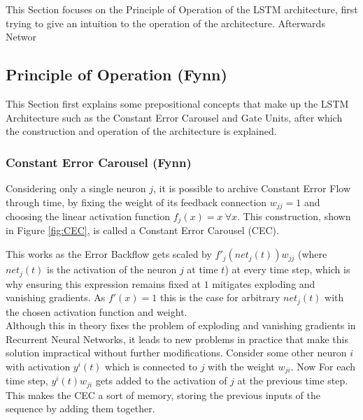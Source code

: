 \documentclass[twoside,a4paper,10pt,DIV=12,BCOR=12mm]{scrartcl}
\begin{document}
This Section focuses on the Principle of Operation of the LSTM architecture, first trying to give an intuition to the operation of the architecture. Afterwards Networ

\subsection{Principle of Operation (Fynn)}
This Section first explains some prepositional concepts that make up the LSTM Architecture such as the Constant Error Carousel and Gate Units, after which the construction and operation of the architecture is explained.

\subsubsection{Constant Error Carousel (Fynn)}
Considering only a single neuron $j$, it is possible to archive Constant Error Flow through time, by fixing the weight of its feedback connection $w_{jj}=1$ and choosing the linear activation function $f_j(x)=x\ \forall x$. This construction, shown in Figure \ref{fig:CEC}, is called a Constant Error Carousel (CEC).\cite{hochreiter1997lstm}
\begin{center}
\label{fig:CEC}
\end{center}
This works as the Error Backflow gets scaled by $f'_j(net_j(t))w_{jj}$ (where $net_j(t)$ is the activation of the neuron $j$ at time $t$) at every time step, which is why ensuring this expression remains fixed at $1$ mitigates exploding and vanishing gradients. As $f'(x)=1$ this is the case for arbitrary $net_j(t)$ with the chosen activation function and weight.\cite{hochreiter1997lstm} \\
Although this in theory fixes the problem of exploding and vanishing gradients in Recurrent Neural Networks, it leads to new problems in practice that make this solution impractical without further modifications. Consider some other neuron $i$ with activation $y^i(t)$ which is connected to $j$ with the weight $w_{ji}$.  Now For each time step, $y^i(t)w_{ji}$ gets added to the activation of $j$ at the previous time step. This makes the CEC a sort of memory, storing the previous inputs of the sequence by adding them together.\cite{hochreiter1997lstm} \\
\end{document}
